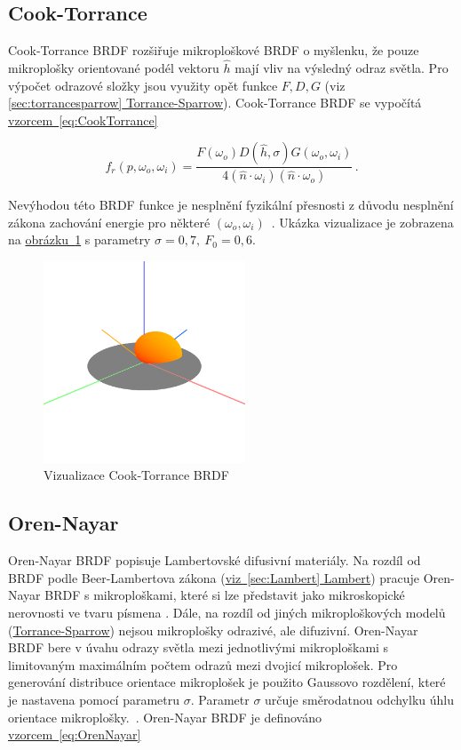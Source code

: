 \documentclass[czech,master]{diploma}
\newcommand{\uvec}[1]{\hat{#1}}
\newcommand{\point}{p}
\newcommand{\brdf}{f_r\left(\point,\omega_{o},\omega_{i}\right)}
\newcommand{\normVec}{\uvec{n}}
\newcommand{\inVec}{\omega_{i}}
\newcommand{\outVec}{\omega_{o}}
\newcommand{\halfVec}{\uvec{h}}
\newcommand{\rough}{\sigma}
\newcommand{\Fzero}{F_0}
\begin{document}
\subsection{Cook-Torrance}
Cook-Torrance BRDF rozšiřuje mikroploškové BRDF o myšlenku, že pouze mikroplošky orientované podél vektoru \(\halfVec\) mají vliv na výsledný odraz světla. Pro výpočet odrazové složky jsou využity opět funkce \(F, D, G\) (viz \hyperref[sec:torrancesparrow]{\ref{sec:torrancesparrow} Torrance-Sparrow}). Cook-Torrance BRDF se vypočítá \hyperref[eq:CookTorrance]{vzorcem~\ref{eq:CookTorrance}}~\cite{CookTorranceBRDF}

\begin{equation} \label{eq:CookTorrance}
  \brdf  = \frac{F(\outVec) D(\halfVec,\rough) G(\outVec,\inVec)}{4 (\normVec\cdot\inVec) (\normVec\cdot\outVec)}\,.
\end{equation}

Nevýhodou této BRDF funkce je nesplnění fyzikální přesnosti z důvodu nesplnění zákona zachování energie pro některé \(\left(\outVec,\inVec\right)\)~\cite{BRDFOverview}. Ukázka vizualizace je zobrazena na \hyperref[fig:cookTorranceBRDFRender]{obrázku~\ref{fig:cookTorranceBRDFRender}} s parametry \(\rough=0{,}7,~\Fzero = 0{,}6\).


\begin{figure}[ht]%
  \centering\includegraphics[width=6cm]{Figures/visualizations/brdfCookTorrance.png}%
  \caption{Vizualizace Cook-Torrance BRDF}%
  \label{fig:cookTorranceBRDFRender}%
\end{figure}

\subsection{Oren-Nayar}
Oren-Nayar BRDF popisuje Lambertovské difusivní materiály. Na rozdíl od BRDF podle Beer-Lambertova zákona (\hyperref[sec:Lambert]{viz~\ref{sec:Lambert} Lambert}) pracuje Oren-Nayar BRDF s mikroploškami, které si lze představit jako mikroskopické nerovnosti ve tvaru písmena . Dále, na rozdíl od jiných mikroploškových modelů (\hyperref[sec:torrancesparrow]{Torrance-Sparrow}) nejsou mikroplošky odrazivé, ale difuzivní. Oren-Nayar BRDF bere v úvahu odrazy světla mezi jednotlivými mikroploškami s limitovaným maximálním počtem odrazů mezi dvojicí mikroplošek. Pro generování distribuce orientace mikroplošek je použito Gaussovo rozdělení, které je nastavena pomocí parametru \(\rough\). Parametr \(\rough\) určuje směrodatnou odchylku úhlu orientace mikroplošky.~\cite{BRDFOverview, OrenNayar}. Oren-Nayar BRDF je definováno \hyperref[eq:OrenNayar]{vzorcem~\ref{eq:OrenNayar}}
\end{document}
